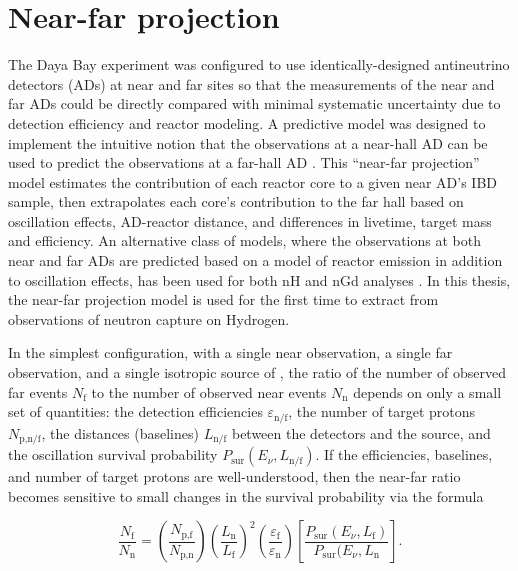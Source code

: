 \section{Near-far projection}
\label{sec:prediction}

The Daya Bay experiment was configured to use
identically-designed antineutrino detectors (ADs) at near and far sites
so that the measurements of the near and far ADs could be directly compared
with minimal systematic uncertainty due to detection efficiency
and reactor modeling.
A predictive model was designed to implement the intuitive notion
that the observations at a near-hall AD can be used to predict
the observations at a far-hall AD \cite{p12e_fitter,p14a_fitter}.
This ``near-far projection'' model estimates the contribution of each reactor core
to a given near AD's IBD sample,
then extrapolates each core's contribution to the far hall
based on oscillation effects, AD-reactor distance,
and differences in livetime, target mass and efficiency.
An alternative class of models,
where the observations at both near and far ADs
are predicted based on a model of reactor \nuebar{} emission
in addition to oscillation effects,
has been used for both nH and nGd analyses \cite{nh2016, ngd2016}.
In this thesis, the near-far projection model is used for the first time
to extract \thetaot{} from observations of neutron capture on Hydrogen.


In the simplest configuration, with a single near observation,
a single far observation, and a single isotropic source of \nuebar,
the ratio of the number of observed far events $N_\text{f}$
to the number of observed near events $N_\text{n}$
depends on only a small set of quantities:
the detection efficiencies $\varepsilon_\text{n/f}$,
the number of target protons $N_\text{p,n/f}$,
the distances (baselines) $L_\text{n/f}$ between the detectors and the source,
and the oscillation survival probability $P_\text{sur}(E_\nu, L_\text{n/f})$.
If the efficiencies, baselines, and number of target protons are well-understood,
then the near-far ratio becomes sensitive
to small changes in the survival probability via the formula \cite{ngd2016}

\begin{equation}\label{eq:near_far}
    \frac{N_\text{f}}{N_\text{n}} = \left(\frac{N_\text{p,f}}{N_\text{p,n}}\right)
    \left(\frac{L_\text{n}}{L_\text{f}}\right)^2
    \left(\frac{\varepsilon_\text{f}}{\varepsilon_\text{n}}\right)
    \left[\frac{P_\text{sur}(E_\nu, L_\text{f})}{P_\text{sur}(E_\nu, L_\text{n}}\right].
\end{equation}

